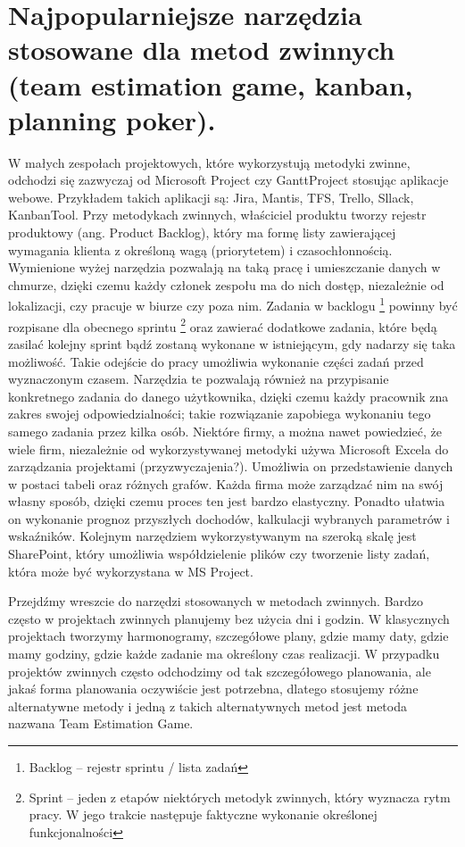\newpage

\section{Najpopularniejsze narzędzia stosowane dla metod zwinnych (team estimation game, kanban, planning poker).}

W małych zespołach projektowych, które wykorzystują metodyki zwinne,
odchodzi się zazwyczaj od Microsoft Project czy GanttProject stosując aplikacje webowe.
Przykładem takich aplikacji są: Jira, Mantis, TFS, Trello, Sllack, KanbanTool. 
Przy metodykach zwinnych, właściciel produktu tworzy rejestr produktowy (ang. Product Backlog),
który ma formę listy zawierającej wymagania klienta z określoną wagą  (priorytetem) i czasochłonnością.\cite{Shwaber_2004}
Wymienione wyżej narzędzia pozwalają na taką pracę i umieszczanie danych w chmurze, dzięki czemu każdy członek zespołu ma do nich dostęp,
niezależnie od lokalizacji, czy pracuje w biurze czy poza nim.
Zadania w backlogu
\footnote{Backlog – rejestr sprintu / lista zadań\cite{metody_zwinne_2016}}
powinny być rozpisane dla obecnego sprintu
\footnote{Sprint – jeden z etapów niektórych metodyk zwinnych, który wyznacza rytm pracy. W jego
trakcie następuje faktyczne wykonanie określonej funkcjonalności\cite{Samoorganizacja_2010}}
oraz zawierać dodatkowe zadania, które będą zasilać kolejny sprint bądź zostaną wykonane w istniejącym, gdy nadarzy się taka możliwość.
Takie odejście do pracy umożliwia wykonanie części zadań przed wyznaczonym czasem.
Narzędzia te pozwalają również na przypisanie konkretnego zadania do danego użytkownika,
dzięki czemu każdy pracownik zna zakres swojej odpowiedzialności; takie rozwiązanie zapobiega wykonaniu tego samego zadania przez kilka osób.
Niektóre firmy, a można nawet powiedzieć, że wiele firm,
niezależnie od wykorzystywanej metodyki używa Microsoft Excela do zarządzania projektami (przyzwyczajenia?).
Umożliwia on przedstawienie danych w postaci tabeli oraz różnych grafów.
Każda firma może zarządzać nim na swój własny sposób, dzięki czemu proces ten jest bardzo elastyczny.
Ponadto ułatwia on wykonanie prognoz przyszłych dochodów, kalkulacji wybranych parametrów i wskaźników.
Kolejnym narzędziem wykorzystywanym na szeroką skalę jest SharePoint,
który umożliwia współdzielenie plików czy tworzenie listy zadań, która może być wykorzystana w MS Project.

Przejdźmy wreszcie do narzędzi stosowanych w metodach zwinnych. Bardzo często w projektach zwinnych planujemy bez użycia dni i godzin.
W klasycznych projektach tworzymy harmonogramy, szczegółowe plany, gdzie mamy daty,
gdzie mamy godziny, gdzie każde zadanie ma określony czas realizacji.
W przypadku projektów zwinnych często odchodzimy od tak szczegółowego planowania, ale jakaś forma planowania oczywiście jest potrzebna,
dlatego stosujemy różne alternatywne metody i jedną z takich alternatywnych metod jest metoda nazwana Team Estimation Game.

